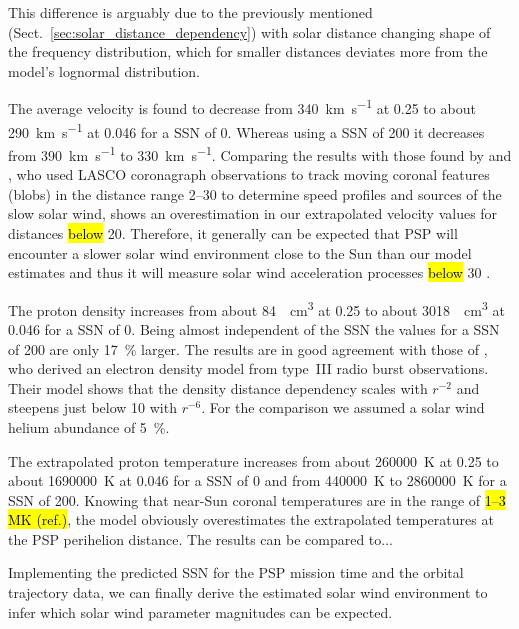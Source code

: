 This difference is arguably due to the previously mentioned (Sect.~\ref{sec:solar_distance_dependency}) with solar distance changing shape of the frequency distribution, which for smaller distances deviates more from the model’s lognormal distribution.

The average velocity is found to decrease from \SI{340}{\km\per\s} at \SI{0.25}{\au} to about \SI{290}{\km\per\s} at \SI{0.046}{\au} for a SSN of 0. Whereas using a SSN of 200 it decreases from \SI{390}{\km\per\s} to \SI{330}{\km\per\s}. Comparing the results with those found by \citep{Sheeley1997} and \citet{Wang2000}, who used LASCO coronagraph observations to track moving coronal features (blobs) in the distance range \SIrange{2}{30}{\Rs} to determine speed profiles and sources of the slow solar wind, shows an overestimation in our extrapolated velocity values for distances \hl{below} \SI{20}{\Rs}. Therefore, it generally can be expected that PSP will encounter a slower solar wind environment close to the Sun than our model estimates and thus it will measure solar wind acceleration processes \hl{below} \SI{30}{\Rs} \citep{Sheeley1997,McComas2008}.

The proton density increases from about \SI{84}{\per\cm\cubed} at  \SI{0.25}{\au} to about \SI{3018}{\per\cm\cubed} at \SI{0.046}{\au} for a SSN of 0. Being almost independent of the SSN the values for a SSN of 200 are only \SI{17}{\%} larger. The results are in good agreement with those of \citet{Leblanc1998}, who derived an electron density model from type~III radio burst observations. Their model shows that the density distance dependency scales with $r^{-2}$ and steepens just below \SI{10}{\Rs} with $r^{-6}$. For the comparison we assumed a solar wind helium abundance of \SI{5}{\%}.

The extrapolated proton temperature increases from about \SI{260000}{\K} at \SI{0.25}{\au} to about \SI{1690000}{\K} at \SI{0.046}{\au} for a SSN of 0 and from \SI{440000}{\K} to \SI{2860000}{\K} for a SSN of 200. Knowing that near-Sun coronal temperatures are in the range of \hl{1--3 MK (ref.)}, the model obviously overestimates the extrapolated temperatures at the PSP perihelion distance. {\color{red} The results can be compared to...}

Implementing the predicted SSN for the PSP mission time and the orbital trajectory data, we can finally derive the estimated solar wind environment to infer which solar wind parameter magnitudes can be expected.

